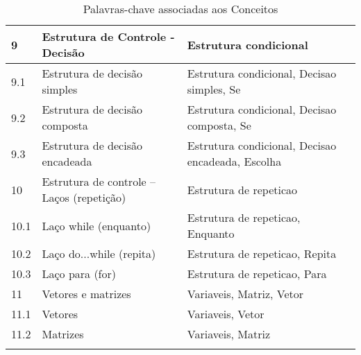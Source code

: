 \begin{longtable}{| p{} | p{} | p{} |}
9        & Estrutura de Controle - Decisão                          & Estrutura condicional                                                                                                         \\ \hline
9.1      & Estrutura de decisão simples                             & Estrutura condicional, Decisao simples, Se                                                                                    \\ \hline
9.2      & Estrutura de decisão composta                            & Estrutura condicional, Decisao composta, Se                                                                                   \\ \hline
9.3      & Estrutura de decisão encadeada                           & Estrutura condicional, Decisao encadeada, Escolha                                                                             \\ \hline
10       & Estrutura de controle – Laços (repetição)                & Estrutura de repeticao                                                                                                        \\ \hline
10.1     & Laço while (enquanto)                                    & Estrutura de repeticao, Enquanto                                                                                              \\ \hline
10.2     & Laço do...while (repita)                                 & Estrutura de repeticao, Repita                                                                                                \\ \hline
10.3     & Laço para (for)                                          & Estrutura de repeticao, Para                                                                                                  \\ \hline
11       & Vetores e matrizes                                       & Variaveis, Matriz, Vetor                                                                                                      \\ \hline
11.1     & Vetores                                                  & Variaveis, Vetor                                                                                                              \\ \hline
11.2     & Matrizes                                                 & Variaveis, Matriz \\ \hline
\caption{Palavras-chave associadas aos Conceitos}
\label{tab:palavras-chave-conceitos}
\end{longtable}

